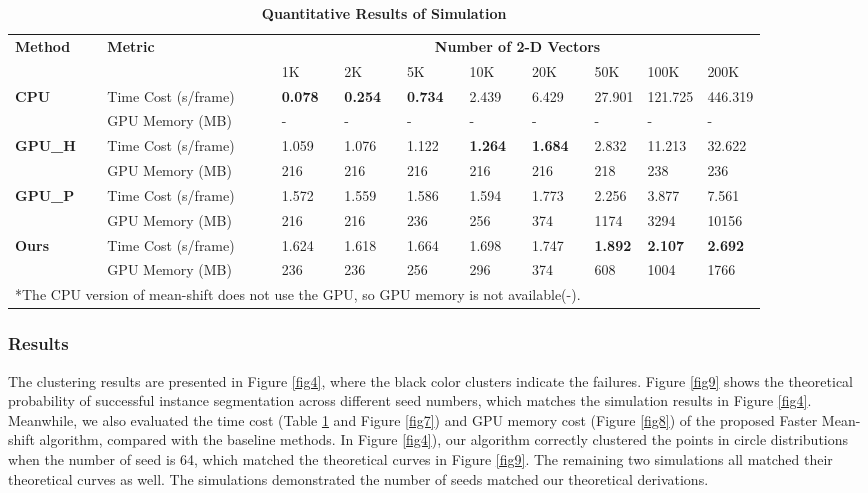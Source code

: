 \documentclass[journal,twoside,web]{ieeecolor}
\begin{document}
\begin{table}[t]
\caption{\textbf{Quantitative Results of Simulation}}
\setlength{\tabcolsep}{3pt}
\renewcommand\arraystretch{1.3}
\centering
\begin{tabular}{p{3.3cm}<{\centering} | p{3cm}<{\centering} | p{1.2cm}<{\centering} p{1.2cm}<{\centering}  p{1.2cm}<{\centering} p{1.2cm}<{\centering} p{1.2cm}<{\centering}  p{1.2cm}<{\centering}  p{1.2cm}<{\centering} p{1.2cm}<{\centering}}
\hline
\hline
\multirow{2}{*}{\textbf{Method}} & \multirow{2}{*}{\textbf{Metric}} & \multicolumn{8}{c}{\textbf{Number of 2-D Vectors}}\\
\cline{3-10}
 & & 1K & 2K & 5K & 10K & 20K & 50K & 100K & 200K \\
\hline
\textbf{CPU} & Time Cost (s/frame) & \textbf{0.078} & \textbf{0.254} & \textbf{0.734} & 2.439 & 6.429 & 27.901 & 121.725 & 446.319 \\
~\cite{b33,b15} & GPU Memory (MB) & - & - & - & - & - & - & - & - \\
\hline
\textbf{GPU\_H}& Time Cost (s/frame) & 1.059 & 1.076 & 1.122 & \textbf{1.264} & \textbf{1.684} & 2.832 & 11.213 & 32.622 \\
~\cite{b19}  & GPU Memory (MB) & 216 & 216 & 216 & 216 & 216 & 218 & 238 & 236 \\
\hline
\textbf{GPU\_P} & Time Cost (s/frame) & 1.572 & 1.559 & 1.586 & 1.594 & 1.773 & 2.256 & 3.877 & 7.561 \\
~\cite{b18} & GPU Memory (MB) & 216 & 216 & 236 & 256 & 374 & 1174 & 3294 & 10156 \\
\hline
\multirow{2}{*}{\textbf{Ours}} & Time Cost (s/frame) & 1.624 & 1.618 & 1.664 & 1.698 & 1.747 & \textbf{1.892} & \textbf{2.107} & \textbf{2.692} \\
 & GPU Memory (MB) & 236 & 236 & 256 & 296 & 374 & 608 & 1004 & 1766 \\
\hline
\hline
\multicolumn{7}{l}{*The CPU version of mean-shift does not use the GPU, so GPU memory is not available(-).}\
\end{tabular}
\label{tab1}
\end{table}

\subsubsection{Results}
The clustering results are presented in Figure \ref{fig4}, where the black color clusters indicate the failures. Figure \ref{fig9} shows the theoretical probability of successful instance segmentation across different seed numbers, which matches the simulation results in Figure \ref{fig4}. Meanwhile, we also evaluated the time cost (Table \ref{tab1} and Figure \ref{fig7}) and GPU memory cost (Figure \ref{fig8}) of the proposed Faster Mean-shift algorithm, compared with the baseline methods. In Figure \ref{fig4}), our algorithm correctly clustered the points in circle distributions when the number of seed is 64, which matched the theoretical curves in Figure \ref{fig9}. The remaining two simulations all matched their theoretical curves as well. The simulations demonstrated the number of seeds matched our theoretical derivations.
\end{document}
